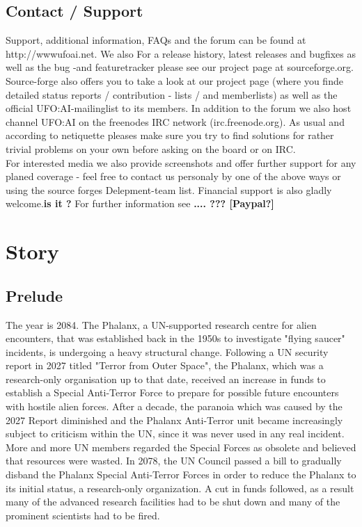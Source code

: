 \subsection{Contact / Support}
Support, additional information, FAQs and the forum can be found at http://wwwufoai.net. We also
For a release history, latest releases and bugfixes as well as the bug -and featuretracker please see our project page at sourceforge.org. Source-forge also offers you to take a look at our project page (where you finde detailed status reports / contribution - lists / and memberlists) as well as the official UFO:AI-mailinglist to its members. In addition to the forum we also host channel UFO:AI on the freenodes IRC network (irc.freenode.org).  As usual and according to netiquette pleases make sure you try to find solutions for rather trivial problems on your own before asking on the board or on IRC.\\
For interested media we also provide screenshots and offer further support for any planed coverage - feel free to contact us personaly by one of the above ways or using the source forges Delepment-team list.
Financial support is also gladly welcome.\textbf{is it ?} For further information see \textbf{.... ??? [Paypal?]}

\newpage

\section{Story}
\subsection{Prelude}
The year is 2084. The Phalanx, a UN-supported research centre for alien encounters, that was established back in the 1950s to investigate "flying saucer" incidents, is undergoing a heavy structural change. Following a UN security report in 2027 titled "Terror from Outer Space", the Phalanx, which was a research-only organisation up to that date, received an increase in funds to establish a Special Anti-Terror Force to prepare for possible future encounters with hostile alien forces. After a decade, the paranoia which was caused by the 2027 Report diminished and the Phalanx Anti-Terror unit became increasingly subject to criticism within the UN, since it was never used in any real incident. More and more UN members regarded the Special Forces as obsolete and believed that resources were wasted. In 2078, the UN Council passed a bill to gradually disband the Phalanx Special Anti-Terror Forces in order to reduce the Phalanx to its initial status, a research-only organization. A cut in funds followed, as a result many of the advanced research facilities had to be shut down and many of the prominent scientists had to be fired.

